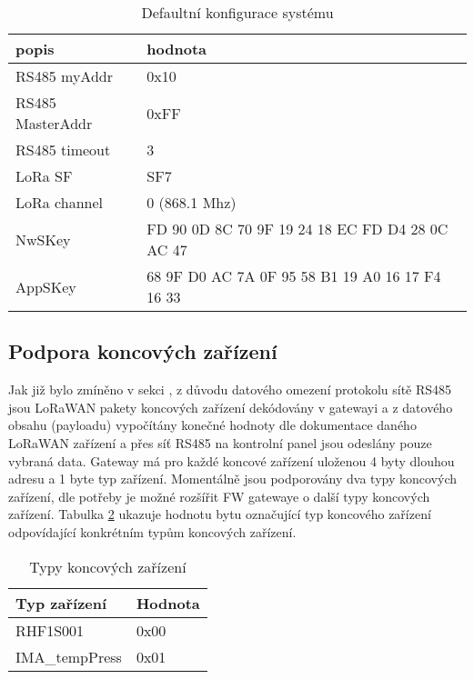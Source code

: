 \begin{table}[!h]
    \centering
    \begin{ctucolortab}
    \begin{tabular}{ |l|l| }
     \hline

     popis              & hodnota         \\ \hline \hline
     RS485 myAddr       & 0x10            \\ \hline
     RS485 MasterAddr   & 0xFF            \\ \hline
     RS485 timeout      & 3               \\ \hline
     LoRa SF            & SF7             \\ \hline
     LoRa channel       & 0 (868.1 Mhz)   \\ \hline
     NwSKey             & FD 90 0D 8C 70 9F 19 24 18 EC FD D4 28 0C AC 47  \\ \hline
     AppSKey            & 68 9F D0 AC 7A 0F 95 58 B1 19 A0 16 17 F4 16 33  \\ \hline

    \end{tabular}
\end{ctucolortab}
    \caption{Defaultní konfigurace systému}
    \label{table:5}
\end{table}


\newpage
\subsection{Podpora koncových zařízení}
Jak již bylo zmíněno v sekci \label{Implementace WSN do přístupového systému}, z důvodu datového omezení protokolu sítě RS485 jsou LoRaWAN pakety koncových zařízení dekódovány v gatewayi a z datového obsahu (payloadu) vypočítány konečné hodnoty dle dokumentace daného LoRaWAN zařízení a přes síť RS485 na kontrolní panel jsou odeslány pouze vybraná data. Gateway má pro každé koncové zařízení uloženou 4 byty dlouhou adresu a 1 byte typ zařízení.
Momentálně jsou podporovány dva typy koncových zařízení, dle potřeby je možné rozšířit FW gatewaye o další typy koncových zařízení. Tabulka \ref{table:TypyKoncZarizeni} ukazuje hodnotu bytu označující typ koncového zařízení odpovídající konkrétním typům koncových zařízení.

\begin{table}[!h]
    \centering
    \begin{ctucolortab}
    \begin{tabular}{ |l|l| }
     \hline

     Typ zařízení       & Hodnota         \\ \hline \hline
     RHF1S001           & 0x00            \\ \hline
     IMA\_tempPress     & 0x01            \\ \hline
     
    \end{tabular}
    \end{ctucolortab}
    \caption{Typy koncových zařízení}
    \label{table:TypyKoncZarizeni}
\end{table}

